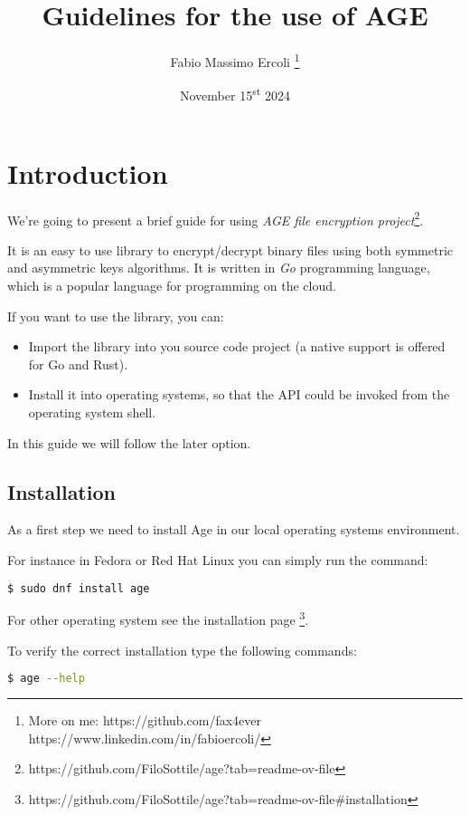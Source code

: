 \documentclass{article}
\title{Guidelines for the use of AGE}
\author{Fabio Massimo Ercoli
	\footnote{
		More on me:
		https://github.com/fax4ever
		https://www.linkedin.com/in/fabioercoli/
}}
\date{November 15\textsuperscript{st} 2024}
\begin{document}
	
	\maketitle
	\thispagestyle{empty}
	
	\section{Introduction}
	
	We're going to present a brief guide for using \emph{AGE file encryption project}\footnote{https://github.com/FiloSottile/age?tab=readme-ov-file}.
	
	It is an easy to use library to encrypt/decrypt binary files using both symmetric and asymmetric keys algorithms. 
	It is written in \emph{Go} programming language, which is a popular language for programming on the cloud. 
	
	If you want to use the library, you can:
	
	\begin{itemize}
		\item Import the library into you source code project (a native support is offered for Go and Rust).
		\item Install it into operating systems, so that the API could be invoked from the operating system shell.
	\end{itemize}
	
	In this guide we will follow the later option.
	
	\subsection{Installation}
	
	As a first step we need to install Age in our local operating systems environment.
	
	\medskip
	
	\noindent For instance in Fedora or Red Hat Linux you can simply run the command:
	\begin{lstlisting}[language=bash]
	$ sudo dnf install age
	\end{lstlisting}
	
	\noindent For other operating system see the installation page \footnote{https://github.com/FiloSottile/age?tab=readme-ov-file\#installation}.
	
	\medskip
	
	\noindent To verify the correct installation type the following commands:
	\begin{lstlisting}[language=bash]
	$ age --help
	\end{lstlisting}
	
\end{document}
